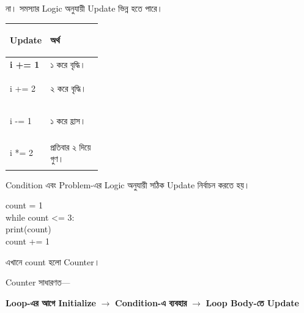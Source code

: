 

না। সমস্যার Logic অনুযায়ী Update ভিন্ন হতে পারে।

\begin{tabularx}
{\linewidth}
{
|>{\bfseries\RaggedRight\arraybackslash}p{0.30\linewidth}
|Y|
}

\hline
{}

\textbf{Update}
&
\textbf{অর্থ}
\\
\hline

\textenglish{\ttfamily i += 1}
&
১ করে বৃদ্ধি।
\\
\hline

\textenglish{\ttfamily i += 2}
&
২ করে বৃদ্ধি।
\\
\hline

\textenglish{\ttfamily i -= 1}
&
১ করে হ্রাস।
\\
\hline

\textenglish{\ttfamily i *= 2}
&
প্রতিবার ২ দিয়ে গুণ।
\\
\hline

\end{tabularx}

Condition এবং Problem-এর Logic অনুযায়ী সঠিক Update নির্বাচন করতে হয়।



\begin{codebox}
\begin{english}
\ttfamily
count = 1\\[0.5mm]
while count <= 3:\\
\hspace*{4mm}print(count)\\
\hspace*{4mm}count += 1
\end{english}
\end{codebox}

এখানে
\textenglish{\ttfamily count}
হলো Counter।

Counter সাধারণত—

\begin{center}

\textbf{Loop-এর আগে Initialize}
\(\longrightarrow\)
\textbf{Condition-এ ব্যবহার}
\(\longrightarrow\)
\textbf{Loop Body-তে Update}

\end{center}

